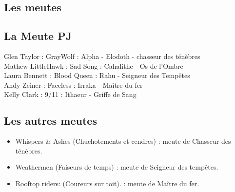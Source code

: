 \documentclass[oneside,12pt]{book}
\begin{document}
\begin{flushleft}
\section{Les meutes}
\subsection{La Meute PJ}
Glen Taylor : GrayWolf : Alpha - Elodoth - chasseur des ténèbres\\
Mathew LittleHawk : Sad Song : Cahalithe - Os de l’Ombre \\
Laura Bennett : Blood Queen : Rahu - Seigneur des Tempêtes\\
Andy Zeiner : Faceless : Irraka - Maître du fer\\
Kelly Clark : 9/11 : Ithaeur - Griffe de Sang\\

\subsection{Les autres meutes}
\begin{itemize}
\item Whispers \& Ashes (Chuchotements et cendres) : meute de Chasseur des ténèbres.
\item Weathermen (Faiseurs de temps) : meute de Seigneur des tempêtes.
\item Rooftop riders: (Coureurs sur toit). : meute de Maître du fer.
\end{itemize}


\clearpage

\end{flushleft}
\end{document}
